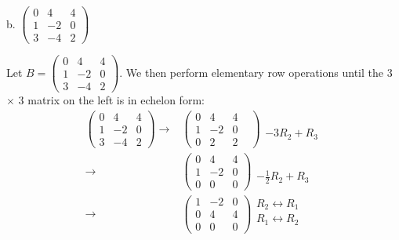 \documentclass[12pt]{article}
\newenvironment{problem}[2][Problem]
{
	\begin{trivlist} 
		\item[\hskip \labelsep {\bfseries #1 #2:}]
	}
{
	\end{trivlist}
	}
\newenvironment{solution}[1][Solution]
{
	\begin{trivlist} 
		\item[\hskip \labelsep {\itshape #1:}]
	}
	{
	\end{trivlist}
}
\begin{document}
\begin{problem}{5}
\begin{solution}
\end{solution}
%
%
\newpage
b. $\begin{pmatrix} 0&4&4\\1&-2&0\\3&-4&2 \end{pmatrix}$
\begin{solution}
Let $B=\begin{pmatrix} 0&4&4\\1&-2&0\\3&-4&2 \end{pmatrix}$.
We then perform elementary row operations until the 3 $\times$ 3 matrix on the left is in echelon form:
\begin{align*}
\begin{pmatrix} 0&4&4\\1&-2&0\\3&-4&2 \end{pmatrix} \rightarrow & \begin{pmatrix}  0&4&4&\\1&-2&0\\0&2&2 \end{pmatrix} \begin{matrix} \text{} \\ \text{} \\ -3R_2+R_3\text{} \end{matrix} \\
%
\rightarrow & \begin{pmatrix}  0&4&4\\1&-2&0\\0&0&0 \end{pmatrix} \begin{matrix} \text{} \\ \text{} \\ -\frac{1}{2}R_2+R_3\text{} \end{matrix} \\
%
\rightarrow & \begin{pmatrix}  1&-2&0\\0&4&4\\0&0&0 \end{pmatrix} \begin{matrix} R_2\leftrightarrow R_1 \text{} \\ R_1\leftrightarrow R_2\text{} \\ \text{} \end{matrix}

\end{align*}
\end{solution}
\end{problem}
\end{document}
